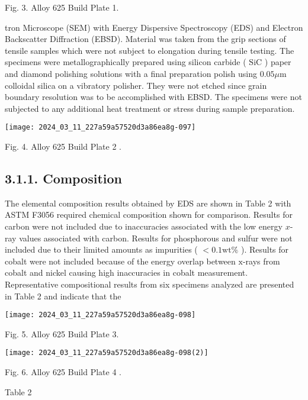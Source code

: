 \documentclass[10pt]{article}
\begin{document}
Fig. 3. Alloy 625 Build Plate 1.

tron Microscope (SEM) with Energy Dispersive Spectroscopy (EDS) and Electron Backscatter Diffraction (EBSD). Material was taken from the grip sections of tensile samples which were not subject to elongation during tensile testing. The specimens were metallographically prepared using silicon carbide ( $\mathrm{SiC}$ ) paper and diamond polishing solutions with a final preparation polish using $0.05 \mu \mathrm{m}$ colloidal silica on a vibratory polisher. They were not etched since grain boundary resolution was to be accomplished with EBSD. The specimens were not subjected to any additional heat treatment or stress during sample preparation.

\begin{center}
\texttt{[image: 2024\_03\_11\_227a59a57520d3a86ea8g-097]}
\end{center}

Fig. 4. Alloy 625 Build Plate 2 .

\subsection*{3.1.1. Composition}
The elemental composition results obtained by EDS are shown in Table 2 with ASTM F3056 required chemical composition shown for comparison. Results for carbon were not included due to inaccuracies associated with the low energy $x$-ray values associated with carbon. Results for phosphorous and sulfur were not included due to their limited amounts as impurities ( $<0.1 \mathrm{wt} \%$ ). Results for cobalt were not included because of the energy overlap between $\mathrm{x}$-rays from cobalt and nickel causing high inaccuracies in cobalt measurement. Representative compositional results from six specimens analyzed are presented in Table 2 and indicate that the

\begin{center}
\texttt{[image: 2024\_03\_11\_227a59a57520d3a86ea8g-098]}
\end{center}

Fig. 5. Alloy 625 Build Plate 3.

\begin{center}
\texttt{[image: 2024\_03\_11\_227a59a57520d3a86ea8g-098(2)]}
\end{center}

Fig. 6. Alloy 625 Build Plate 4 .

Table 2
\end{document}
